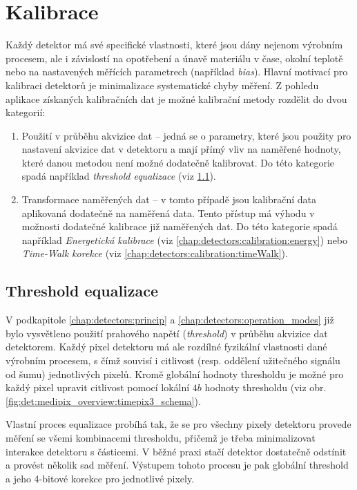 \section{Kalibrace}\label{chap:detectors:calibration}
Každý detektor má své specifické vlastnosti, které jsou dány nejenom výrobním procesem, ale i závislostí na opotřebení a únavě materiálu v čase, okolní teplotě nebo na nastavených měřících parametrech (například \textit{bias}). Hlavní motivací pro kalibraci detektorů je minimalizace systematické chyby měření. Z pohledu aplikace získaných kalibračních dat je možné kalibrační metody rozdělit do dvou kategorií:
\begin{enumerate}[label=(\roman*)]
	\item Použití v průběhu akvizice dat -- jedná se o parametry, které jsou použity pro nastavení akvizice dat v detektoru a mají přímý vliv na naměřené hodnoty, které danou metodou není možné dodatečně kalibrovat. Do této kategorie spadá například \textit{threshold equalizace} (viz \ref{chap:detectors:calibration:equalization}).
	\item Transformace naměřených dat -- v tomto případě jsou kalibrační data aplikovaná dodatečně na naměřená data. Tento přístup má výhodu v možnosti dodatečné kalibrace již naměřených dat. Do této kategorie spadá například \textit{Energetická kalibrace} (viz \ref{chap:detectors:calibration:energy}) nebo \textit{Time-Walk korekce} (viz \ref{chap:detectors:calibration:timeWalk}).
\end{enumerate}

\subsection{Threshold equalizace}\label{chap:detectors:calibration:equalization}
V podkapitole \ref{chap:detectors:princip} a \ref{chap:detectors:operation_modes} již bylo vysvětleno použití prahového napětí (\textit{threshold}) v průběhu akvizice dat detektorem. Každý pixel detektoru má ale rozdílné fyzikální vlastnosti dané výrobním procesem, s čímž souvisí i citlivost (resp. oddělení užitečného signálu od šumu) jednotlivých pixelů. Kromě globální hodnoty thresholdu je možné pro každý pixel upravit citlivost pomocí lokální $4b$ hodnoty thresholdu (viz obr. \ref{fig:det:medipix_overview:timepix3_schema}).

Vlastní proces equalizace probíhá tak, že se pro všechny pixely detektoru provede měření se všemi kombinacemi thresholdu, přičemž je třeba minimalizovat interakce detektoru s částicemi. V běžné praxi stačí detektor dostatečně odstínit a provést několik sad měření. Výstupem tohoto procesu je pak globální threshold a jeho 4-bitové korekce pro jednotlivé pixely.

